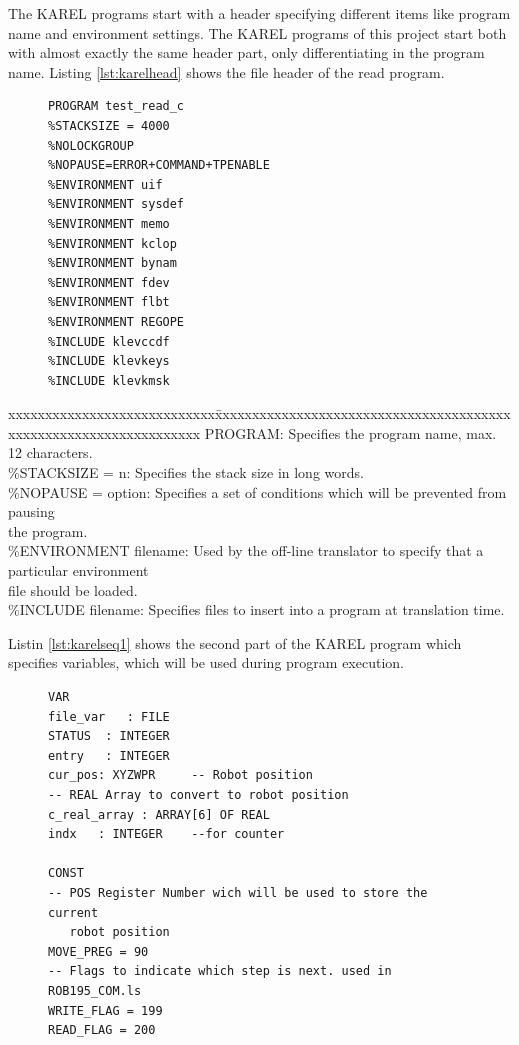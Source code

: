 \label{subsec:sendread}                                
The KAREL programs start with a header specifying different items like program name and environment settings. The KAREL programs of this project start both with almost exactly the same header part, only differentiating in the program name. Listing \ref{lst:karelhead} shows the file header of the read program.
\begin{figure}[H]
\begin{lstlisting}[frame = single, caption={KAREL header of the "read robot positions" function}, captionpos=b, label={lst:karelhead}]  
PROGRAM test_read_c
%STACKSIZE = 4000
%NOLOCKGROUP
%NOPAUSE=ERROR+COMMAND+TPENABLE
%ENVIRONMENT uif
%ENVIRONMENT sysdef
%ENVIRONMENT memo
%ENVIRONMENT kclop
%ENVIRONMENT bynam
%ENVIRONMENT fdev
%ENVIRONMENT flbt
%ENVIRONMENT REGOPE
%INCLUDE klevccdf
%INCLUDE klevkeys
%INCLUDE klevkmsk
\end{lstlisting}
\end{figure} 
\begin{tabbing}
	xxxxxxxxxxxxxxxxxxxxxxxxxxxx\=xxxxxxxxxxxxxxxxxxxxxxxxxxxxxxxxxxxxxxxxxxxxxxxxxxxxxxxxxxxxxxxxxx \kill
	PROGRAM:	\> Specifies the program name, max. 12 characters.	\\	
	\%STACKSIZE = n:		\>  Specifies the stack size in long words. \\				
	\%NOPAUSE = option:	\> Specifies a set of conditions which will  be prevented from pausing\\
						\>  the program. 		\\							%
	\%ENVIRONMENT filename:	\> Used by the off-line translator to specify that a particular environment\\
					\> file should be loaded. 				\\	
	\%INCLUDE filename:		\>  Specifies files to insert into a program at translation time. 				\\							%
	
\end{tabbing}
Listin \ref{lst:karelseq1} shows the second part of the KAREL program which specifies variables, which will be used during program execution.
\begin{figure}[H]
\begin{lstlisting}[frame = single, caption={KAREL variable definitions}, captionpos=b, label={lst:karelseq1}]
VAR
file_var   : FILE
STATUS  : INTEGER
entry   : INTEGER
cur_pos: XYZWPR		-- Robot position
-- REAL Array to convert to robot position
c_real_array : ARRAY[6] OF REAL  
indx   : INTEGER    --for counter

CONST
-- POS Register Number wich will be used to store the current
   robot position
MOVE_PREG = 90
-- Flags to indicate which step is next. used in ROB195_COM.ls
WRITE_FLAG = 199
READ_FLAG = 200
\end{lstlisting}
\end{figure} 
